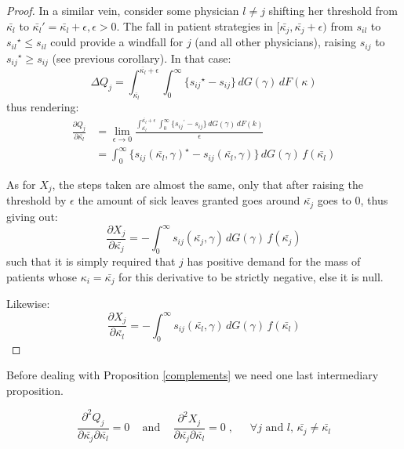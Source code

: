 \documentclass[../main.tex]{subfiles}
\begin{document}
\begin{proof}
In a similar vein, consider some physician $l \neq j$ shifting her threshold from $\bar{\kappa_{l}}$ to $\bar{\kappa_l}' = \bar{\kappa_l} + \epsilon, \epsilon > 0$. The fall in patient strategies in $[\bar{\kappa_j}, \bar{\kappa_j} + \epsilon)$ from $s_{il}$ to ${s_{il}}^{\star} \leq s_{il}$ could provide a windfall for $j$ (and all other physicians), raising $s_{ij}$ to ${s_{ij}}^{\star} \geq s_{ij}$ (see previous corollary). In that case:
\[
\Delta Q_j = \int_{\bar{\kappa_l}}^{\bar{\kappa_l} + \epsilon} \int_{0}^{\infty} \{ {s_{ij}}^{\star} - s_{ij}\} \,dG(\gamma) \,dF(\kappa) 
\]
thus rendering:
\begin{align*}
    \frac{\partial Q_{j}}{\partial\bar{\kappa_{l}}} & = \lim_{\epsilon \rightarrow 0} \frac{\int_{\bar{\kappa_l}}^{\bar{\kappa_l} + \epsilon} \int_{0}^{\infty} \{ {s_{ij}}^{\prime} - s_{ij}\} \,dG(\gamma) \,dF(k)}{\epsilon} \\
    & = \int_{0}^{\infty} \{ {s_{ij}} (\bar{\kappa_l}, \gamma)^{\star} - s_{ij} (\bar{\kappa_l}, \gamma)\} \,dG(\gamma) \,f(\bar{\kappa_l}) 
\end{align*}

As for $X_j$, the steps taken are almost the same, only that after raising the threshold by $\epsilon$ the amount of sick leaves granted goes around $\bar{\kappa_j}$ goes to $0$, thus giving out:
\[
\frac{\partial X_{j}}{\partial\bar{\kappa_{j}}} = - \int_{0}^{\infty}  s_{ij} (\bar{\kappa_j}, \gamma) \,dG(\gamma) \,f(\bar{\kappa_j})
\]
such that it is simply required that $j$ has positive demand for the mass of patients whose $\kappa_i = \bar{\kappa_j}$ for this derivative to be strictly negative, else it is null.

Likewise:
\[
\frac{\partial X_{j}}{\partial\bar{\kappa_{l}}} = - \int_{0}^{\infty}  s_{ij} (\bar{\kappa_l}, \gamma) \,dG(\gamma) \,f(\bar{\kappa_l})
\]

\end{proof}

Before dealing with Proposition \ref{complements} we need one last intermediary proposition.

\begin{prop}
\[
\frac{\partial^2 Q_{j}}{\partial\bar{\kappa_{j}} \partial\bar{\kappa_{l}}} = 0 \;\;\; \text{ and } \;\;\; \frac{\partial^2 X_{j}}{\partial\bar{\kappa_{j}} \partial\bar{\kappa_{l}}} = 0 \;, \;\;\; \text{ $\forall j$ and $l$, $\bar{\kappa_{j}} \neq \bar{\kappa_{l}}$}
\]
 \end{prop}
\end{document}

